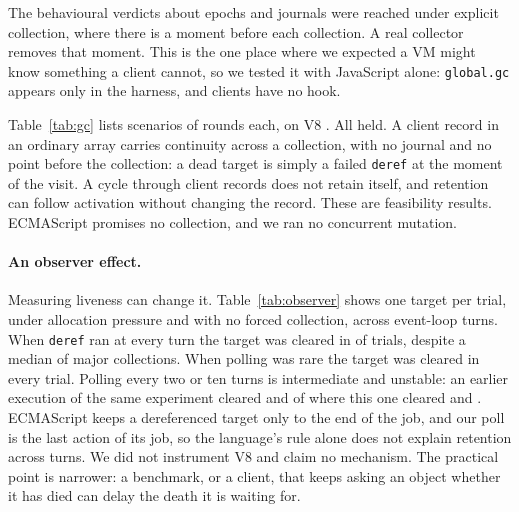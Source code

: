 \documentclass[11pt]{article}
\begin{document}
The behavioural verdicts about epochs and journals were reached under explicit collection, where there is a moment before each collection. A real collector removes that moment. This is the one place where we expected a VM might know something a client cannot, so we tested it with JavaScript alone: \texttt{global.gc} appears only in the harness, and clients have no hook.

Table~\ref{tab:gc} lists \gcScenarios{} scenarios of \gcRounds{} rounds each, on V8 \veeEightVersion{}. All held. A client record in an ordinary array carries continuity across a collection, with no journal and no point before the collection: a dead target is simply a failed \texttt{deref} at the moment of the visit. A cycle through client records does not retain itself, and retention can follow activation without changing the record. These are feasibility results. ECMAScript promises no collection, and we ran no concurrent mutation.

\begin{table}[tbp]
\centering
\footnotesize

\caption{Lifecycle properties under V8's collector, using \texttt{WeakRef}, \texttt{WeakMap} and \texttt{FinalizationRegistry}.}
\label{tab:gc}
\end{table}

\paragraph{An observer effect.} Measuring liveness can change it. Table~\ref{tab:observer} shows one target per trial, under allocation pressure and with no forced collection, across \observerTurns{} event-loop turns. When \texttt{deref} ran at every turn the target was cleared in \observerEveryOneCleared{} of \observerTrials{} trials, despite a median of \observerEveryOneMajors{} major collections. When polling was rare the target was cleared in every trial. Polling every two or ten turns is intermediate and unstable: an earlier execution of the same experiment cleared \observerEarlierEveryTwo{} and \observerEarlierEveryTen{} of \observerTrials{} where this one cleared \observerEveryTwoCleared{} and \observerEveryTenCleared{}. ECMAScript keeps a dereferenced target only to the end of the job, and our poll is the last action of its job, so the language's rule alone does not explain retention across turns. We did not instrument V8 and claim no mechanism. The practical point is narrower: a benchmark, or a client, that keeps asking an object whether it has died can delay the death it is waiting for.
\end{document}
